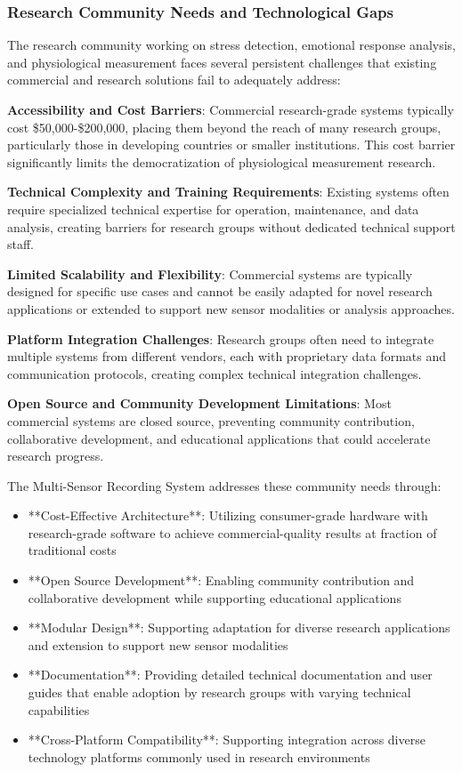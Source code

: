 \documentclass[11pt,a4paper]{article}
\begin{document}
\subsubsection{Research Community Needs and Technological Gaps}

The research community working on stress detection, emotional response analysis, and
physiological measurement faces
several persistent challenges that existing commercial and research solutions fail to
adequately address:

\textbf{Accessibility and Cost Barriers}: Commercial research-grade systems typically cost \$50,000-\$200,000, placing them
beyond the reach of many research groups, particularly those in developing countries
or smaller institutions.  This cost
barrier significantly limits the democratization of physiological
measurement research.

\textbf{Technical Complexity and Training Requirements}: Existing systems often require specialized technical expertise for
operation, maintenance, and data analysis, creating barriers for research groups
without dedicated technical support
staff.

\textbf{Limited Scalability and Flexibility}: Commercial systems are typically designed for specific use cases and cannot be
easily adapted for novel research applications or extended to support new sensor
modalities or analysis approaches.

\textbf{Platform Integration Challenges}: Research groups often need to integrate multiple systems from different vendors,
each with proprietary data formats and communication protocols, creating complex
technical integration challenges.

\textbf{Open Source and Community Development Limitations}: Most commercial systems are closed source, preventing community
contribution, collaborative development, and educational applications that could
accelerate research progress.

The Multi-Sensor Recording System addresses these community needs through:

\begin{itemize}
\item **Cost-Effective Architecture**: Utilizing consumer-grade hardware with research-grade software to achieve
  commercial-quality results at fraction of traditional costs
\item **Open Source Development**: Enabling community contribution and collaborative development while supporting
  educational applications
\item **Modular Design**: Supporting adaptation for diverse research applications and extension to support new sensor
  modalities
\item **Documentation**: Providing detailed technical documentation and user guides that enable adoption by
  research groups with varying technical capabilities
\item **Cross-Platform Compatibility**: Supporting integration across diverse technology platforms commonly used in research
  environments

\end{itemize}
\end{document}
